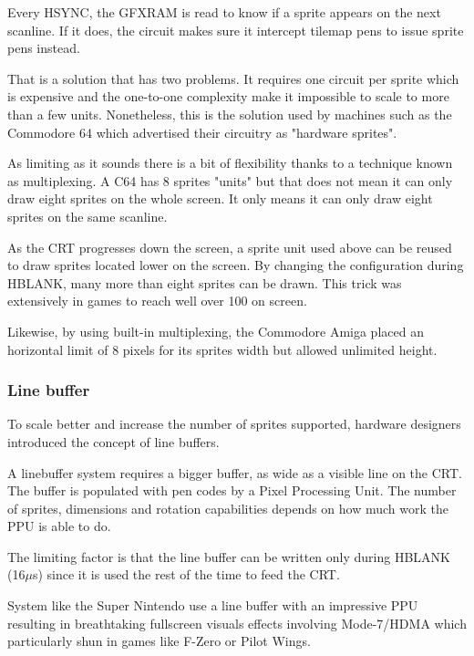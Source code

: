 Every HSYNC, the GFXRAM is read to know if a sprite appears on the next scanline. If it does, the circuit makes sure it intercept tilemap pens to issue sprite pens instead. 

That is a solution that has two problems. It requires one circuit per sprite which is expensive and the one-to-one complexity make it impossible to scale to more than a few units. Nonetheless, this is the solution used by machines such as the Commodore 64 which advertised their circuitry as "hardware sprites".


As limiting as it sounds there is a bit of flexibility thanks to a technique known as multiplexing. A C64 has 8 sprites "units" but that does not mean it can only draw eight sprites on the whole screen. It only means it can only draw eight sprites on the same scanline.

As the CRT progresses down the screen, a sprite unit used above can be reused to draw sprites located lower on the screen. By changing the configuration during HBLANK, many more than eight sprites can be drawn. This trick was extensively in games to reach well over 100 on screen.


Likewise, by using built-in multiplexing, the Commodore Amiga placed an horizontal limit of 8 pixels for its sprites width but allowed unlimited height.

\subsubsection{Line buffer}
To scale better and increase the number of sprites supported, hardware designers introduced the concept of line buffers. 

A linebuffer system requires a bigger buffer, as wide as a visible line on the CRT. The buffer is populated with pen codes by a Pixel Processing Unit. The number of sprites, dimensions and rotation capabilities depends on how much work the PPU is able to do. 

The limiting factor is that the line buffer can be written only during HBLANK (16$\mu$s) since it is used the rest of the time to feed the CRT.

System like the Super Nintendo use a line buffer with an impressive PPU resulting in breathtaking fullscreen visuals effects involving Mode-7/HDMA which particularly shun in games like F-Zero or Pilot Wings.








